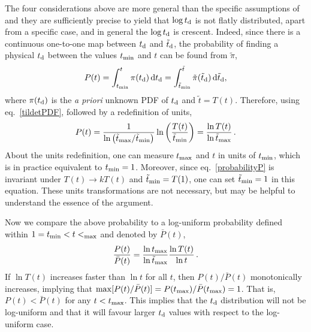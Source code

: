 \documentclass[fleqn,usenatbib,useAMS]{mnras}
\begin{document}
The four considerations above are more general than the specific assumptions of \citet{Ghodla:2023iaz} and they  are sufficiently precise to yield that $\log t_{\rm d}$ is not flatly distributed, apart from a specific case, and in general the $\log t_{\rm d}$ is crescent. Indeed, since there is a continuous one-to-one map between $t_{\rm d}$ and $\tilde t_{\rm d}$, the probability of finding a physical $t_{\rm d}$ between the values $t_{\rm min}$ and $t$ can be found from $\tilde \pi$,
\begin{equation}
    P(t) = \int_{t_{\rm min}}^{t} \pi(t_{\rm d}) \, {\rm d} t_{\rm d} =\int_{\tilde t_{\rm min}}^{\tilde t} \tilde \pi(\tilde t_{\rm d}) \, {\rm d} \tilde t_{\rm d}, 
\end{equation}
where $\pi(t_{\rm d})$ is the \textit{a priori} unknown PDF of $t_{\rm d}$ and $\tilde t = T(t)$. Therefore, using eq.~\eqref{tildetPDF}, followed by a redefinition of units,
\begin{equation} \label{probabilityP}
    P(t) = \frac{1}{\ln \left( {\tilde t_{\rm max}}/{\tilde t_{\rm min}}\right) } 
    \ln \left( \frac{T(t)}{\tilde t_{\rm min}}\right)  = 
    \frac{\ln T(t)}{\ln  {\tilde t_{\rm max}} } \, .
\end{equation}
About the units redefinition, one can measure $t_{\rm max}$ and $t$ in units of $t_{\rm min}$, which is in practice equivalent to $t_{\rm min} = 1$. Moreover, since eq.~\eqref{probabilityP} is invariant under $T(t) \to k T(t)$ and $\tilde t_{\rm min} = T(1)$, one can set $\tilde t_{\rm min} =1$ in this equation. These units transformations are not necessary, but may be helpful to understand the essence of the argument.

Now we compare the above probability to a log-uniform probability defined within $1=t_{\rm min} < t < _{\rm max}$ and denoted by $\bar P(t)$,
\begin{equation} \label{PbarP}
    \frac{P(t)}{\bar P(t)} = 
    \frac{\ln  { t_{\rm max}}}{\ln  {\tilde t_{\rm max}} } \frac{\ln T(t)}{\ln t }\, .
\end{equation}
If $\ln T(t)$ increases faster than $\ln t$ for all $t$, then ${P(t)}/{\bar P(t)}$ monotonically increases, implying that $\max [{P(t)}/{\bar P(t)}] = {P(t_{\rm max})}/{\bar P(t_{\rm max})} =  1$. That is, $P(t) < \bar P(t)$ for any $t < t_{\rm max}$. This implies that the $t_{\rm d}$ distribution will not be log-uniform and that  it will favour larger $t_{\rm d}$ values with respect to the log-uniform case. 
\end{document}
